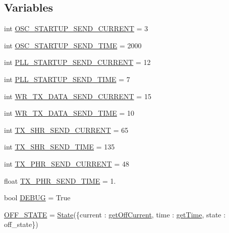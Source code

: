 \subsection*{Variables}
\begin{DoxyCompactItemize}
\item 
int \mbox{\hyperlink{namespacesimlib_1_1_f_s_m_ad06bef4160eb32f6d69e2cee7c5a542d}{O\+S\+C\+\_\+\+S\+T\+A\+R\+T\+U\+P\+\_\+\+S\+E\+N\+D\+\_\+\+C\+U\+R\+R\+E\+NT}} = 3
\item 
int \mbox{\hyperlink{namespacesimlib_1_1_f_s_m_afdc8ffeb3e90a25bc390230d4b9b062c}{O\+S\+C\+\_\+\+S\+T\+A\+R\+T\+U\+P\+\_\+\+S\+E\+N\+D\+\_\+\+T\+I\+ME}} = 2000
\item 
int \mbox{\hyperlink{namespacesimlib_1_1_f_s_m_a0cbe584dface80049bc29e028c92a607}{P\+L\+L\+\_\+\+S\+T\+A\+R\+T\+U\+P\+\_\+\+S\+E\+N\+D\+\_\+\+C\+U\+R\+R\+E\+NT}} = 12
\item 
int \mbox{\hyperlink{namespacesimlib_1_1_f_s_m_ae72a2c59067991d4c2a5b9a93adf6c80}{P\+L\+L\+\_\+\+S\+T\+A\+R\+T\+U\+P\+\_\+\+S\+E\+N\+D\+\_\+\+T\+I\+ME}} = 7
\item 
int \mbox{\hyperlink{namespacesimlib_1_1_f_s_m_ad7618cc58ef99027f3c106d304a924ec}{W\+R\+\_\+\+T\+X\+\_\+\+D\+A\+T\+A\+\_\+\+S\+E\+N\+D\+\_\+\+C\+U\+R\+R\+E\+NT}} = 15
\item 
int \mbox{\hyperlink{namespacesimlib_1_1_f_s_m_ace613e37159d009a12c28ad50e78e6bb}{W\+R\+\_\+\+T\+X\+\_\+\+D\+A\+T\+A\+\_\+\+S\+E\+N\+D\+\_\+\+T\+I\+ME}} = 10
\item 
int \mbox{\hyperlink{namespacesimlib_1_1_f_s_m_ab9f90c6e53002fac12a2652560e1a25d}{T\+X\+\_\+\+S\+H\+R\+\_\+\+S\+E\+N\+D\+\_\+\+C\+U\+R\+R\+E\+NT}} = 65
\item 
int \mbox{\hyperlink{namespacesimlib_1_1_f_s_m_abdfeb3c1f386f4b50572216a78dbc673}{T\+X\+\_\+\+S\+H\+R\+\_\+\+S\+E\+N\+D\+\_\+\+T\+I\+ME}} = 135
\item 
int \mbox{\hyperlink{namespacesimlib_1_1_f_s_m_a5f1b4ff3254e7cb116a6bfcd9c0a163d}{T\+X\+\_\+\+P\+H\+R\+\_\+\+S\+E\+N\+D\+\_\+\+C\+U\+R\+R\+E\+NT}} = 48
\item 
float \mbox{\hyperlink{namespacesimlib_1_1_f_s_m_ad1c9f7efdb8a7d415be004bc6526476b}{T\+X\+\_\+\+P\+H\+R\+\_\+\+S\+E\+N\+D\+\_\+\+T\+I\+ME}} = 1.
\item 
bool \mbox{\hyperlink{namespacesimlib_1_1_f_s_m_a1953119b522c9596d79f398f2519976e}{D\+E\+B\+UG}} = True
\item 
\mbox{\hyperlink{namespacesimlib_1_1_f_s_m_a7eb7aa74e342e04c15ef89a79cbbdb11}{O\+F\+F\+\_\+\+S\+T\+A\+TE}} = \mbox{\hyperlink{classsimlib_1_1_f_s_m_1_1_state}{State}}(\{\textquotesingle{}current\textquotesingle{} \+: \mbox{\hyperlink{namespacesimlib_1_1_f_s_m_ad5212728fbbcd07317b41dcadd83abf5}{get\+Off\+Current}}, \textquotesingle{}time\textquotesingle{} \+: \mbox{\hyperlink{namespacesimlib_1_1_f_s_m_a11348c0ee93cab46de076fcf8ec8395f}{get\+Time}}, \textquotesingle{}state\textquotesingle{} \+: \textquotesingle{}off\+\_\+state\textquotesingle{}\})

\end{DoxyCompactItemize}

